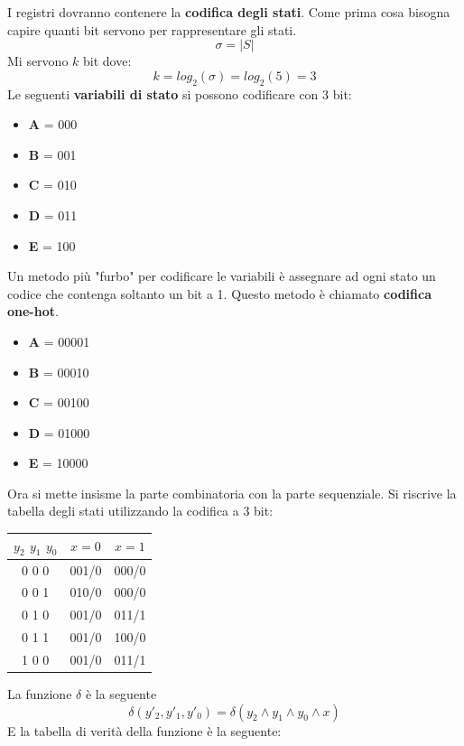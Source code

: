 \documentclass[a4paper]{article}
\theoremstyle{break}
\theoremstyle{break}
\theoremstyle{break}
\theoremstyle{break}
\begin{document}
I registri dovranno contenere la \textbf{codifica degli stati}. Come prima cosa bisogna
capire quanti bit servono per rappresentare gli stati.
\[
\sigma = |S|
\] 
Mi servono \( k \) bit dove:
\[
k = log_2(\sigma) = log_2(5) = 3
\] 
Le seguenti \textbf{variabili di stato} si possono codificare con 3 bit:
\begin{itemize}
  \centering
  \item \textbf{A} = 000
  \item \textbf{B} = 001
  \item \textbf{C} = 010
  \item \textbf{D} = 011
  \item \textbf{E} = 100
\end{itemize}
Un metodo più "furbo" per codificare le variabili è assegnare ad ogni stato un codice
che contenga soltanto un bit a 1. Questo metodo è chiamato \textbf{codifica one-hot}.
\begin{itemize}
  \centering
  \item \textbf{A} = 00001
  \item \textbf{B} = 00010
  \item \textbf{C} = 00100
  \item \textbf{D} = 01000
  \item \textbf{E} = 10000
\end{itemize}
Ora si mette insisme la parte combinatoria con la parte sequenziale. Si riscrive la tabella
degli stati utilizzando la codifica a 3 bit:
\begin{table}[H]
  \begin{center}
    \begin{tabular}{c|c|c}
      \( y_2 \) \( y_1 \) \( y_0 \) & \( x=0 \)  & \( x=1 \)  \\
      \hline
      0 0 0 & 001/0 & 000/0 \\
      0 0 1 & 010/0 & 000/0 \\
      0 1 0 & 001/0 & 011/1 \\
      0 1 1 & 001/0 & 100/0 \\
      1 0 0 & 001/0 & 011/1 \\
    \end{tabular}
  \end{center}
\end{table}
La funzione \( \delta \)  è la seguente
\[ \delta(y'_2,y'_1,y'_0) = \delta(y_2 \wedge y_1 \wedge y_0 \wedge x) \]
E la tabella di verità della funzione è la seguente:
\end{document}
